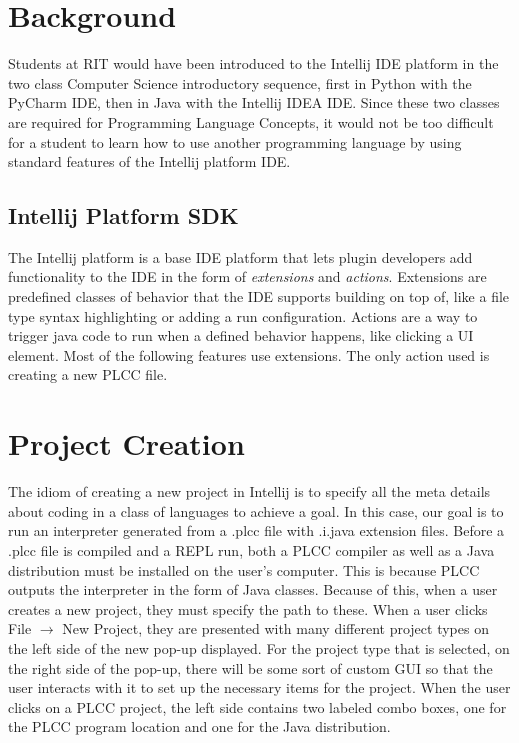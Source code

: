 \documentclass[conference, letterpaper]{IEEEtran}
\begin{document}
\section{Background}\label{sec:background}
Students at RIT would have been introduced to the Intellij IDE platform in the two class Computer Science introductory sequence, first in Python with the PyCharm IDE, then in Java with the Intellij IDEA IDE\@.
Since these two classes are required for Programming Language Concepts, it would not be too difficult for a student to learn how to use another programming language by using standard features of the Intellij platform IDE\@.

\subsection{Intellij Platform SDK}\label{subsec:intellij-platform-sdk}
The Intellij platform is a base IDE platform that lets plugin developers add functionality to the IDE in the form of \textit{extensions} and \textit{actions}.
Extensions are predefined classes of behavior that the IDE supports building on top of, like a file type syntax highlighting or adding a run configuration.
Actions are a way to trigger java code to run when a defined behavior happens, like clicking a UI element.
Most of the following features use extensions.
The only action used is creating a new PLCC file.


\section{Project Creation}\label{sec:project-creation}
The idiom of creating a new project in Intellij is to specify all the meta details about coding in a class of languages to achieve a goal.
In this case, our goal is to run an interpreter generated from a .plcc file with .i.java extension files.
Before a .plcc file is compiled and a REPL run, both a PLCC compiler as well as a Java distribution must be installed on the user's computer.
This is because PLCC outputs the interpreter in the form of Java classes.
Because of this, when a user creates a new project, they must specify the path to these.
When a user clicks File $\rightarrow$ New Project, they are presented with many different project types on the left side of the new pop-up displayed.
For the project type that is selected, on the right side of the pop-up, there will be some sort of custom GUI so that the user interacts with it to set up the necessary items for the project.
When the user clicks on a PLCC project, the left side contains two labeled combo boxes, one for the PLCC program location and one for the Java distribution.
\end{document}
